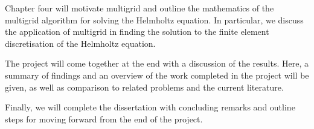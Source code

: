 Chapter four will motivate multigrid and outline the mathematics of the multigrid algorithm for solving the Helmholtz equation.
In particular, we discuss the application of multigrid in finding the solution to the finite element discretisation of the Helmholtz equation.

The project will come together at the end with a discussion of the results.
Here, a summary of findings and an overview of the work completed in the project will be given, as well as comparison to related problems and the current literature.

Finally, we will complete the dissertation with concluding remarks and outline steps for moving forward from the end of the project.